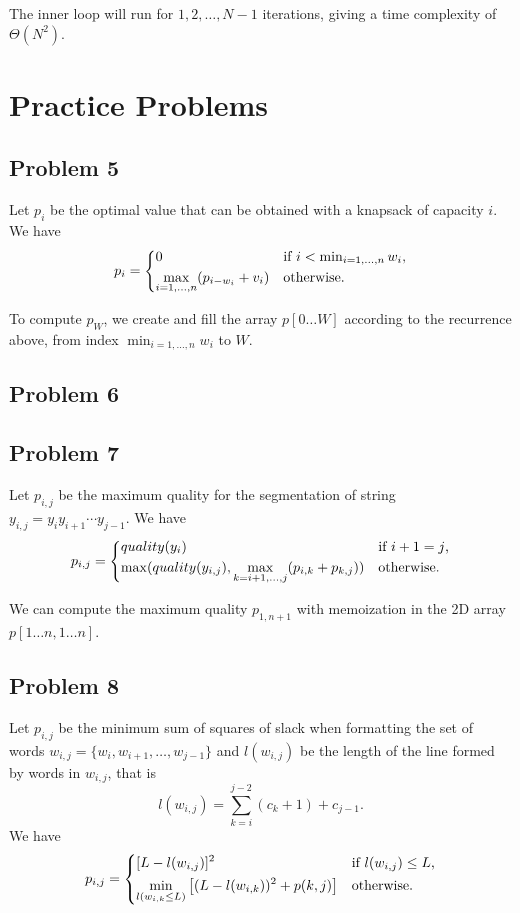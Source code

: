 \documentclass{article}
\begin{document}
The inner loop will run for $1, 2, \dots, N - 1$ iterations, giving a time complexity of $\Theta(N^2)$.

\section*{Practice Problems}

\subsection*{Problem 5}

Let $p_i$ be the optimal value that can be obtained with a knapsack of capacity $i$. We have
\[
    p_i = \begin{dcases*}
        0 & if $i < \min_{i = 1, \dots, n} w_i$,\\
        \max_{i = 1, \dots, n} (p_{i - w_i} + v_i) & otherwise.\\
    \end{dcases*}
\]

To compute $p_W$, we create and fill the array $p[0\dots W]$ according to the recurrence above, from index $\min_{i = 1, \dots, n} w_i$ to $W$.

\subsection*{Problem 6}

\subsection*{Problem 7}

Let $p_{i, j}$ be the maximum quality for the segmentation of string $y_{i, j} = y_iy_{i + 1}{\cdots}y_{j - 1}$. We have
\[
    p_{i, j} = \begin{dcases*}
        quality(y_i) & if $i + 1 = j$,\\
        \max(quality(y_{i, j}), \max_{k = i + 1, \dots, j}(p_{i, k} + p_{k, j})) & otherwise.
    \end{dcases*}
\]

We can compute the maximum quality $p_{1, n + 1}$ with memoization in the 2D array $p[1\dots n, 1\dots n]$.

\subsection*{Problem 8}

Let $p_{i, j}$ be the minimum sum of squares of slack when formatting the set of words $w_{i, j} = \{w_i, w_{i + 1}, \dots, w_{j - 1}\}$ and $l(w_{i, j})$ be the length of the line formed by words in $w_{i, j}$, that is
\[
    l(w_{i, j}) = \sum_{k = i}^{j - 2} (c_k + 1) + c_{j - 1}.
\]
We have
\[
    p_{i, j} = \begin{dcases*}
        [L - l(w_{i, j})]^2 & if $l(w_{i, j}) \le L$,\\
        \min_{l(w_{i, k} \le L)} \left[(L - l(w_{i, k}))^2 + p(k, j)\right] & otherwise.
    \end{dcases*}
\]
\end{document}
